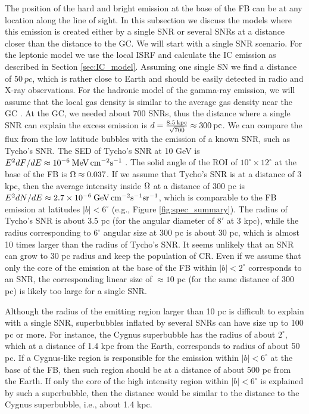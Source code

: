 The position of the hard and bright emission at the base of the FB can be at any location along the line of sight.
In this subsection we discuss the models where this emission is created either by a single SNR
or several SNRs at a distance closer than the distance to the GC.
We will start with a single SNR scenario.
For the leptonic model we use the local ISRF and calculate the IC emission as described in Section \ref{sec:IC_model}.
Assuming one single SN we find a distance of $\SI{50}{pc}$, which is rather close to Earth and should 
be easily detected in radio and X-ray observations.
For the hadronic model of the gamma-ray emission, we will assume that 
the local gas density is similar to the average gas density near the GC \citep{2017ApJ...834...57M}.
At the GC, we needed about 700 SNRs, thus the distance where a single SNR can explain the excess emission
is $d = \frac{8.5\: {\rm kpc}}{\sqrt{700}} \approx 300\:{\rm pc}$.
We can compare the flux from the low latitude bubbles with the emission of a known SNR, such as Tycho's SNR.
The SED of Tycho's SNR at 10 GeV is $E^2 {dF}/{dE} \approx 10^{-6}\: {\rm MeV\, cm^{-2} s^{-1}}$ \citep{2017ApJ...836...23A}.
The solid angle of the ROI of $10^\circ \times 12^\circ$ at the base of the FB is $\Omega \approx 0.037$.
If we assume that Tycho's SNR is at a distance of 3 kpc, then the average intensity inside $\Omega$ at a distance of 300 pc
is $E^2 {dN}/{dE} \approx 2.7 \times 10^{-6}\: {\rm GeV\, cm^{-2} s^{-1} sr^{-1}}$, which is comparable to the 
FB emission at latitudes $|b| < 6^\circ$ (e.g., Figure \ref{fig:spec_summary}).
The radius of Tycho's SNR is about 3.5 pc (for the angular diameter of $8'$ at 3 kpc),
while the radius corresponding to $6^\circ$ angular size at 300 pc is about 30 pc, which is almost 10 times larger than the radius of Tycho's SNR.
It seems unlikely that an SNR can grow to 30 pc radius and keep the population of CR.
Even if we assume that only the core of the emission at the base of the FB within $|b| < 2^\circ$ corresponds to an SNR,
the corresponding linear size of $\approx 10$ pc (for the same distance of 300 pc) is likely too large for a single SNR.

Although the radius of the emitting region larger than 10 pc is difficult to explain with a single SNR,
superbubbles inflated by several SNRs can have size up to 100 pc or more.
For instance, the Cygnus superbubble \citep{2011Sci...334.1103A} has the radius of about $2^\circ$, 
which at a distance of 1.4 kpc from the Earth, corresponds to radius of about 50 pc.
If a Cygnus-like region is responsible for the emission within $|b| < 6^\circ$ at the base of the FB,
then such region should be at a distance of about 500 pc from the Earth.
If only the core of the high intensity region within $|b| < 6^\circ$ is explained by such a superbubble,
then the distance would be similar to the distance to the Cygnus superbubble, i.e., about 1.4 kpc.

